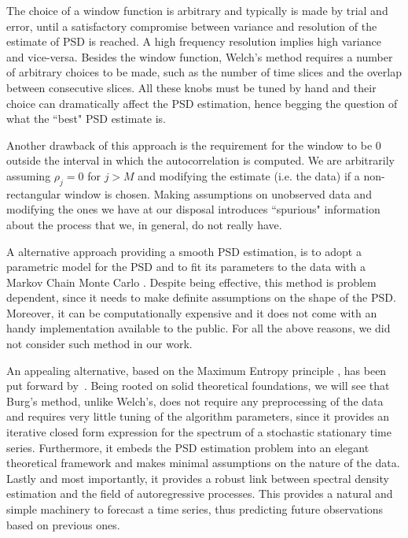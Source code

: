 \documentclass{aa}
\begin{document}
The choice of a window function is arbitrary and typically is made by trial and error, until a satisfactory compromise between variance and resolution of the estimate of PSD is reached. A high frequency resolution implies high variance and vice-versa.
Besides the window function, Welch's method requires a number of arbitrary choices to be made, such as the number of time slices and the overlap between consecutive slices. All these knobs must be tuned by hand and their choice can dramatically affect the PSD estimation, hence begging the question of what the ``best" PSD estimate is.

Another drawback of this approach is the requirement for the window to be $0$ outside the interval in which the autocorrelation is computed.
We are arbitrarily assuming $\rho_j = 0$ for $j > M$ and modifying the estimate (i.e. the data) if a non-rectangular window is chosen.
Making assumptions on unobserved data and modifying the ones we have at our disposal introduces ``spurious" information about the process that we, in general, do not really have.

A alternative approach providing a smooth PSD estimation, is to adopt  a parametric model for the PSD and to fit its parameters to the data with a Markov Chain Monte Carlo \citep[e.g.]{Cornish_2015, Littenberg_2015}. Despite being effective, this method is problem dependent, since it needs to make definite assumptions on the shape of the PSD. Moreover, it can be computationally expensive and it does not come with an handy implementation available to the public. For all the above reasons, we did not consider such method in our work.

An appealing alternative, based on the Maximum Entropy principle \citep{JaynesArticle,jaynes2003ptl, Jaynes_MAXENT}, has been put forward by~\citet{burg1975maximum}. Being rooted on solid theoretical foundations, we will see that Burg's method, unlike Welch's, does not require any preprocessing of the data and requires very little tuning of the algorithm parameters, since it provides an iterative closed form expression for the spectrum of a stochastic stationary time series. Furthermore, it embeds the PSD estimation problem into an elegant theoretical framework and makes minimal assumptions on the nature of the data.
Lastly and most importantly, it provides a robust link between spectral density estimation and the field of autoregressive processes. This provides a natural and simple machinery to forecast a time series, thus predicting future observations based on previous ones.
\end{document}
